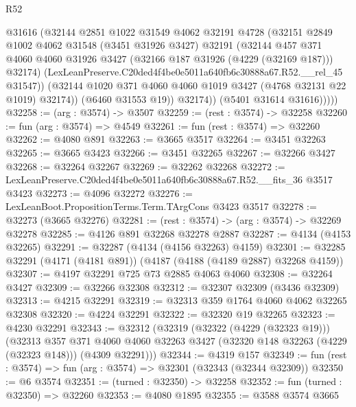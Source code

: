 \begin{lexlean}{R52}
\begin{coremodule}
                  @31616
                  (@32144
                    @2851
                    @1022
                    @31549
                    @4062
                    @32191
                    @4728
                    (@32151
                      @2849
                      @1002
                      @4062
                      @31548
                      (@3451 @31926 @3427)
                      @32191
                      (@32144
                        @457
                        @371
                        @4060
                        @4060
                        @31926
                        @3427
                        (@32166 @187 @31926 (@4229 (@32169 @187)))
                        @32174)
                      (LexLeanPreserve.C20ded4f4be0e5011a640fb6c30888a67.R52.__rel_45 @31547))
                    (@32144 @1020 @371 @4060 @4060 @1019 @3427 (@4768 @32131 @22 @1019) @32174))
                  (@6460 @31553 @19))
                @32174))
            (@5401 @31614 @31616)))))
@32258 := (arg : @3574) -> @3507
@32259 := (rest : @3574) -> @32258
@32260 := fun (arg : @3574) => @4549
@32261 := fun (rest : @3574) => @32260
@32262 := @4080 @891
@32263 := @3665 @3517
@32264 := @3451 @32263
@32265 := @3665 @3423
@32266 := @3451 @32265
@32267 := @32266 @3427
@32268 := @32264 @32267
@32269 := @32262 @32268
@32272 := LexLeanPreserve.C20ded4f4be0e5011a640fb6c30888a67.R52.__fits_36 @3517 @3423
@32273 := @4096 @32272
@32276 := LexLeanBoot.PropositionTerms.Term.TArgCons @3423 @3517
@32278 := @32273 (@3665 @32276)
@32281 := (rest : @3574) -> (arg : @3574) -> @32269 @32278
@32285 := @4126 @891 @32268 @32278 @2887
@32287 := @4134 (@4153 @32265)
@32291 := @32287 (@4134 (@4156 @32263) @4159)
@32301 := @32285 @32291 (@4171 (@4181 @891)) (@4187 (@4188 (@4189 @2887) @32268 @4159))
@32307 := @4197 @32291 @725 @73 @2885 @4063 @4060
@32308 := @32264 @3427
@32309 := @32266 @32308
@32312 := @32307 @32309 (@3436 @32309)
@32313 := @4215 @32291
@32319 := @32313 @359 @1764 @4060 @4062 @32265 @32308
@32320 := @4224 @32291
@32322 := @32320 @19 @32265
@32323 := @4230 @32291
@32343 := @32312
    (@32319
      (@32322 (@4229 (@32323 @19)))
      (@32313
        @357
        @371
        @4060
        @4060
        @32263
        @3427
        (@32320 @148 @32263 (@4229 (@32323 @148)))
        (@4309 @32291)))
@32344 := @4319 @157
@32349 := fun (rest : @3574) => fun (arg : @3574) => @32301 (@32343 (@32344 @32309))
@32350 := @6 @3574
@32351 := (turned : @32350) -> @32258
@32352 := fun (turned : @32350) => @32260
@32353 := @4080 @1895
@32355 := @3588 @3574 @3665

\end{coremodule}
\end{lexlean}
